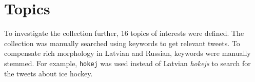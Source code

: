 \documentclass{IOS-Book-Article}
\makeatletter
\newcommand{\hl}[1]{#1}
\newcommand{\sn}[1]{\href{https://twitter.com/#1}{\texttt{@#1}}}
\makeatother
\begin{document}



%
%
%



\section{Topics}
\label{sec:topics}

To investigate the collection further, \hl{16} topics of interests were defined. The collection was manually searched using keywords to get relevant tweets. To compensate rich morphology in Latvian and Russian, keywords were manually stemmed. For example, \texttt{hokej} was used instead of Latvian \textit{hokejs} to search for the tweets about ice hockey. 
\end{document}
